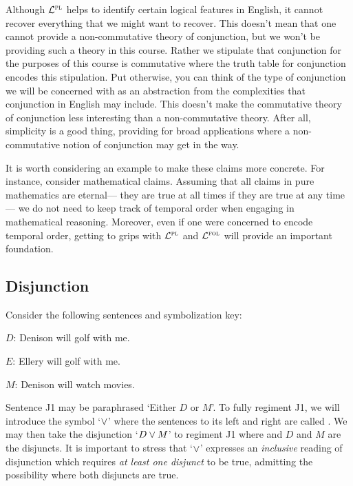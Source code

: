 Although $\mathcal{L}^{\textsc{pl}}$ helps to identify certain logical features in English, it cannot recover everything that we might want to recover.
This doesn't mean that one cannot provide a non-commutative theory of conjunction, but we won't be providing such a theory in this course.
Rather we stipulate that conjunction for the purposes of this course is commutative where the truth table for conjunction encodes this stipulation.
Put otherwise, you can think of the type of conjunction we will be concerned with as an abstraction from the complexities that conjunction in English may include.
This doesn't make the commutative theory of conjunction less interesting than a non-commutative theory.
After all, simplicity is a good thing, providing for broad applications where a non-commutative notion of conjunction may get in the way.

It is worth considering an example to make these claims more concrete.
For instance, consider mathematical claims.
Assuming that all claims in pure mathematics are eternal--- they are true at all times if they are true at any time--- we do not need to keep track of temporal order when engaging in mathematical reasoning.
Moreover, even if one were concerned to encode temporal order, getting to grips with $\mathcal{L}^{\textsc{pl}}$ and $\mathcal{L}^{\textsc{fol}}$ will provide an important foundation.







\subsection{Disjunction}
  \label{sub.disjunction}

Consider the following sentences and symbolization key:

\begin{earg}
\end{earg}

\begin{ekey}
  \item[$D$:] Denison will golf with me.
  \item[$E$:] Ellery will golf with me.
  \item[$M$:] Denison will watch movies.
\end{ekey}

Sentence J1 may be paraphrased `Either $D$ or $M$'.
To fully regiment J1, we will introduce the  symbol `$\vee$' where the sentences to its left and right are called .
We may then take the disjunction `$D \vee M$' to regiment J1 where and $D$ and $M$ are the disjuncts.
It is important to stress that `$\vee$' expresses an \emph{inclusive} reading of disjunction which requires \emph{at least one disjunct} to be true, admitting the possibility where both disjuncts are true.

